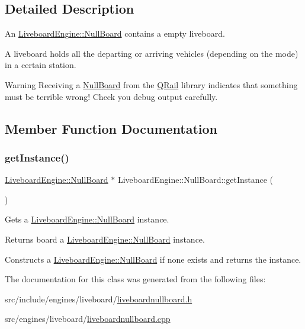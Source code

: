 \subsection{Detailed Description}
An \mbox{\hyperlink{classQRail_1_1LiveboardEngine_1_1NullBoard}{Liveboard\+Engine\+::\+Null\+Board}} contains a empty liveboard. 

A liveboard holds all the departing or arriving vehicles (depending on the mode) in a certain station. \begin{DoxyWarning}{Warning}
Receiving a \mbox{\hyperlink{classQRail_1_1LiveboardEngine_1_1NullBoard}{Null\+Board}} from the \mbox{\hyperlink{namespaceQRail}{Q\+Rail}} library indicates that something must be terrible wrong! Check you debug output carefully. 
\end{DoxyWarning}


\subsection{Member Function Documentation}
\mbox{\label{classQRail_1_1LiveboardEngine_1_1NullBoard_a2d20874ccfcb5be744626e3b97b036fa}} 
\subsubsection{\texorpdfstring{getInstance()}{getInstance()}}
{\footnotesize\ttfamily \mbox{\hyperlink{classQRail_1_1LiveboardEngine_1_1NullBoard}{Liveboard\+Engine\+::\+Null\+Board}} $\ast$ Liveboard\+Engine\+::\+Null\+Board\+::get\+Instance (\begin{DoxyParamCaption}{ }\end{DoxyParamCaption})\hspace{0.3cm}{\ttfamily [static]}}



Gets a \mbox{\hyperlink{classQRail_1_1LiveboardEngine_1_1NullBoard}{Liveboard\+Engine\+::\+Null\+Board}} instance. 

\begin{DoxyReturn}{Returns}
board a \mbox{\hyperlink{classQRail_1_1LiveboardEngine_1_1NullBoard}{Liveboard\+Engine\+::\+Null\+Board}} instance.
\end{DoxyReturn}
Constructs a \mbox{\hyperlink{classQRail_1_1LiveboardEngine_1_1NullBoard}{Liveboard\+Engine\+::\+Null\+Board}} if none exists and returns the instance. 

The documentation for this class was generated from the following files\+:\begin{DoxyCompactItemize}
\item 
src/include/engines/liveboard/\mbox{\hyperlink{liveboardnullboard_8h}{liveboardnullboard.\+h}}\item 
src/engines/liveboard/\mbox{\hyperlink{liveboardnullboard_8cpp}{liveboardnullboard.\+cpp}}\end{DoxyCompactItemize}
